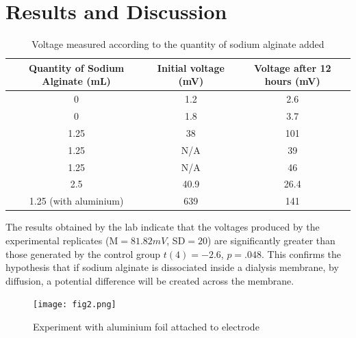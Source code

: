 \documentclass[letterpaper]{article}
\begin{document}



\section{Results and Discussion}
\label{sec:results and Discussion}


\begin{table}[H]
	\centering
	\label{tab:my-table}
	\begin{tabular}{|c|c|c|}
	\hline
	Quantity of Sodium Alginate (mL) & Initial voltage (mV) & Voltage after 12 hours (mV) \\ \hline
	0                                & 1.2                  & 2.6                         \\
	0                                & 1.8                  & 3.7                         \\ \hline
	1.25                             & 38                   & 101                         \\
	1.25                             & N/A                  & 39                          \\
	1.25                             & N/A                  & 46                          \\ \hline
	2.5                              & 40.9                 & 26.4                        \\
	1.25 (with aluminium)            & 639                  & 141                         \\ \hline
	\end{tabular}
	\caption{Voltage measured according to the quantity of sodium alginate added}
	
\end{table}

The results obtained by the lab indicate that the voltages produced by the experimental
replicates (M$=81.82mV$, SD$=20$) are significantly greater than those generated by the 
control group $t(4) = -2.6$, $p = .048$. This confirms the hypothesis that if sodium alginate 
is dissociated inside a dialysis membrane, by diffusion, a potential difference will be 
created across the membrane.

\begin{figure}
	\centering
	\texttt{[image: fig2.png]}
	\caption{Experiment with aluminium foil attached to electrode}
	\label{fig:2}
\end{figure}
\end{document}
